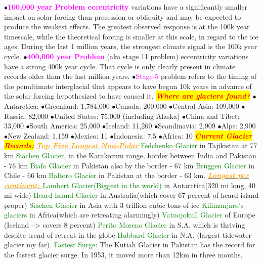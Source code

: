 \documentclass{article}
\newcommand{\ddd}{$\bullet$}
\newcommand{\red}[1]{\textcolor{red}{#1}}
\newcommand{\green}[1]{\textcolor{green}{#1}}
\newcommand{\pink}[1]{\textcolor{magenta}{#1}}
\newcommand{\orange}[1]{\textcolor{orange}{#1}}
\newcommand{\mysection}[1]{\colorbox{yellow}{{\textbf{\textbf{\textit{\red{#1}}}}}}}
\newcommand{\mysub}[1]{\underline{\textbf{{\textit{\orange{#1}}}}}}
\newcommand{\mysubsub}[1]{{{\green{#1}}}}
\newcommand{\vocab}[1]{{\pink{#1}}}
\begin{document}
\begin{multicols*}{4}
	        \ddd \vocab{\textbf{100,000 year Problem eccentricity}} variations have a significantly smaller impact on solar forcing than precession or obliquity and may be expected to produce the weakest effects. The greatest observed response is at the 100k year timescale, while the theoretical forcing is smaller at this scale, in regard to the ice ages. During the last 1 million years, the strongest climate signal is the 100k year cycle.
	        \ddd \vocab{\textbf{400,000 year Problem}} (aka stage 11 problem) eccentricity variations have a strong 400k year cycle. That cycle is only clearly present in climate records older than the last million years.
	        \ddd \vocab{Stage 5} problem refers to the timing of the penultimate interglacial that appears to have begun 10k years in advance of the solar forcing hypothesized to have caused it.
        \mysection{Where are glaciers found?}
            \ddd Antarctica:	\pink{ }
            \ddd Greenland:	1,784,000
            \ddd Canada: 200,000
            \ddd Central Asia:	109,000
            \ddd Russia:	82,000
            \ddd United States:	75,000 (including Alaska)
            \ddd China and Tibet:	33,000
            \ddd South America: 25,000
            \ddd Iceland:	11,260
            \ddd Scandinavia:	2,909
            \ddd Alps: 2,900
            \ddd New Zealand:	1,159
            \ddd Mexico: 11
            \ddd Indonesia:	7.5
            \ddd Africa: 10
		\mysection{Current Glacier Records:} 
		    \mysub{Top Five Longest Non-Polar}
		    \mysubsub {Fedchenko Glacier} in Tajikistan at 77 km
		    \mysubsub {Siachen Glacier}, in the Karakorum range, border between India and Pakistan - 76 km
		    \mysubsub {Biafo Glacier} in Pakistan also by the border - 67 km
		    \mysubsub {Bruggen Glacier} in Chile - 66 km
		    \mysubsub {Baltoro Glacier} in Pakistan at the border - 63 km. \mysub{Longest per continent: } 
		    \mysubsub {Lambert Glacier(Biggest in the world)} in Antarctica(320 mi long, 40 mi wide)
		    \mysubsub {Heard Island Glacier} in Australia(which cover 67 percent of heard island proper)
		    \mysubsub {Siachen Glacier} in Asia with 3 trillion cubic tons of ice
		    \mysubsub {Kilimanjaro's glaciers} in Africa(which are retreating alarmingly)
		    \mysubsub {Vatnojokull Glacier} of Europe (Iceland --> covers 8 percent)
		    \mysubsub {Perito Moreno Glacier} in S.A. which is thriving despite trend of retreat in the globe
		    \mysubsub {Hubbard Glacier} in N.A. (largest tidewater glacier my far). 
		    \mysubsub{Fastest Surge: } The Kutiah Glacier in Pakistan has the record for the fastest glacier surge. In 1953, it moved more than 12km in three months.

\end{multicols*}
\end{document}
